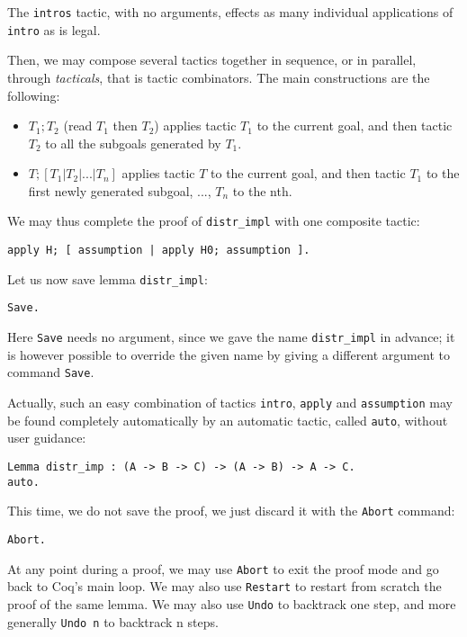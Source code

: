 \documentclass{book}
\begin{document}
The \verb:intros: tactic, with no arguments, effects as many individual
applications of \verb:intro: as is legal.

Then, we may compose several tactics together in sequence, or in parallel,
through {\sl tacticals}, that is tactic combinators. The main constructions
are the following:
\begin{itemize}
\item $T_1 ; T_2$ (read $T_1$ then $T_2$) applies tactic $T_1$ to the current
goal, and then tactic $T_2$ to all the subgoals generated by $T_1$.
\item $T; [T_1 | T_2 | ... | T_n]$ applies tactic $T$ to the current
goal, and then tactic $T_1$ to the first newly generated subgoal, 
..., $T_n$ to the nth.
\end{itemize}

We may thus complete the proof of \verb:distr_impl: with one composite tactic:
\begin{lstlisting}
apply H; [ assumption | apply H0; assumption ].
\end{lstlisting}

Let us now save lemma \verb:distr_impl::
\begin{lstlisting}
Save.
\end{lstlisting}

Here \verb:Save: needs no argument, since we gave the name \verb:distr_impl: 
in advance;
it is however possible to override the given name by giving a different 
argument to command \verb:Save:.

Actually, such an easy combination of tactics \verb:intro:, \verb:apply:
and \verb:assumption: may be found completely automatically by an automatic
tactic, called \verb:auto:, without user guidance:
\begin{lstlisting}
Lemma distr_imp : (A -> B -> C) -> (A -> B) -> A -> C.
auto.
\end{lstlisting}

This time, we do not save the proof, we just discard it with the \verb:Abort: 
command:

\begin{lstlisting}
Abort.
\end{lstlisting}

At any point during a proof, we may use \verb:Abort: to exit the proof mode
and go back to Coq's main loop. We may also use \verb:Restart: to restart
from scratch the proof of the same lemma. We may also use \verb:Undo: to
backtrack one step, and more generally \verb:Undo n: to
backtrack n steps.
\end{document}
